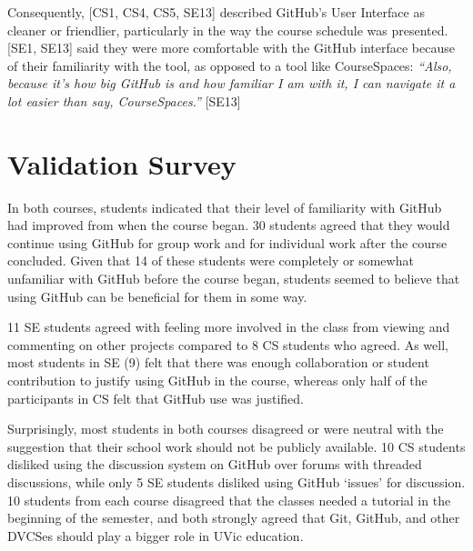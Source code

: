 Consequently, [CS1, CS4, CS5, SE13] described GitHub's User Interface as cleaner or friendlier, particularly in the way the course schedule was presented. [SE1, SE13] said they were more comfortable with the GitHub interface because of their familiarity with the tool, as opposed to a tool like CourseSpaces: \textit{``Also, because it's how big GitHub is and how familiar I am with it, I can navigate it a lot easier than say, CourseSpaces.''} [SE13]


\section{Validation Survey}
In both courses, students indicated that their level of familiarity with GitHub had improved from when the course began. 30 students agreed that they would continue using GitHub for group work and for individual work after the course concluded. Given that 14 of these students were completely or somewhat unfamiliar with GitHub before the course began, students seemed to believe that using GitHub can be beneficial for them in some way.

11 SE students agreed with feeling more involved in the class from viewing and commenting on other projects compared to 8 CS students who agreed. As well, most students in SE (9) felt that there was enough collaboration or student contribution to justify using GitHub in the course, whereas only half of the participants in CS felt that GitHub use was justified.

Surprisingly, most students in both courses disagreed or were neutral with the suggestion that their school work should not be publicly available. 10 CS students disliked using the discussion system on GitHub over forums with threaded discussions, while only 5 SE students disliked using GitHub `issues' for discussion. 10 students from each course disagreed that the classes needed a tutorial in the beginning of the semester, and both strongly agreed that Git, GitHub, and other DVCSes should play a bigger role in UVic education.

